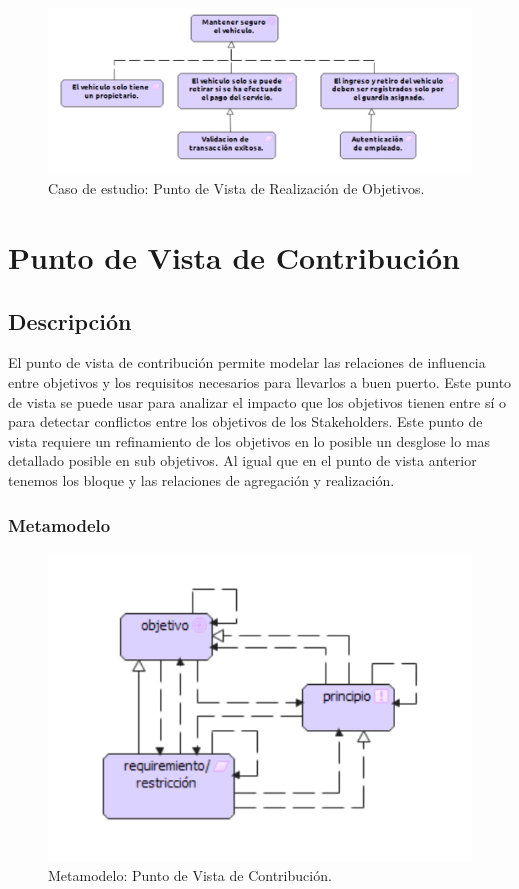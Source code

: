 \begin{figure}[H]
	\centering
	\includegraphics[width=1.0\textwidth]{imagenes/Caso_Estudio/Motivacion/Realizacion_Objetivos.PDF}
	\caption{Caso de estudio: Punto de Vista de Realización de Objetivos.}
	\label{fig:gap_analysis}
\end{figure}

\section{Punto de Vista de Contribución}
\subsection{Descripción}
El punto de vista de contribución permite modelar las relaciones de influencia entre objetivos y los requisitos necesarios para llevarlos a buen puerto. Este punto de vista se puede usar para analizar el impacto que los objetivos tienen entre sí o para detectar conflictos entre los objetivos de los Stakeholders. Este punto de vista requiere un refinamiento de los objetivos en lo posible un desglose lo mas detallado posible en sub objetivos. Al igual que en el punto de vista anterior tenemos los bloque y las relaciones de agregación y realización.

\subsubsection{Metamodelo}
\begin{figure}[H]
	\centering
	\includegraphics[width=1.0\textwidth]{imagenes/Metamodelos/Motivacion/meta_Contribucion.pdf}
	\caption{Metamodelo: Punto de Vista de Contribución.}
	\label{fig:gap_analysis}
\end{figure}

